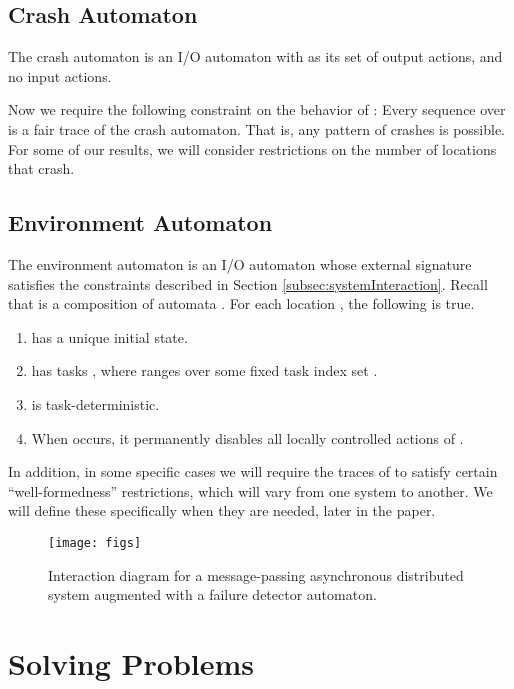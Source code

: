 \documentclass[11pt]{article}
\numberwithin{theorem}{section}
\begin{document}
\subsection{Crash Automaton}
\label{subsec:crashAutomaton}

The crash automaton  is an I/O automaton with
 as its set of output actions,
and no input actions.

Now we require the following constraint on the behavior of
:  Every sequence over  is a fair trace of the
crash automaton.
That is, any pattern of crashes is possible.
For some of our results, we will consider restrictions on the number of locations that crash.

\subsection{Environment Automaton}
\label{subsec:environmentAutomaton}
The environment automaton  is an I/O automaton whose
external signature satisfies the constraints described in Section \ref{subsec:systemInteraction}. Recall that  is a composition of  automata . For each location , the following is true.
\begin{enumerate}
\item  has a unique initial state.
\item  has tasks , where  ranges
over some fixed task index set .
\item  is task-deterministic.
\item When  occurs, it permanently disables all locally controlled
actions of .
\end{enumerate}
In addition, in some specific cases we will require the traces of
 to satisfy certain ``well-formedness'' restrictions,
which will vary from one system to another.
We will define these specifically when they are needed, later in the
paper.

\begin{figure}[htpb]
	\centering
\texttt{[image: figs]}
	\caption{Interaction diagram for a message-passing asynchronous distributed system augmented with a failure detector automaton.}
	\label{fig:interaction_diagram}
\end{figure}




\section{Solving Problems}
\label{sec:solvingProblems}
\end{document}
